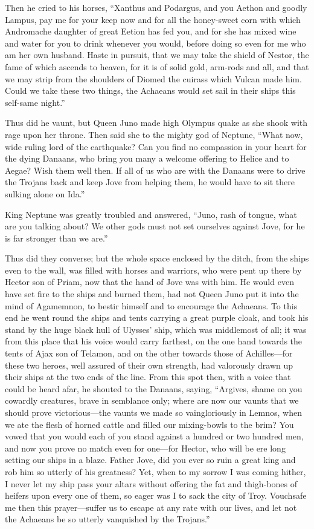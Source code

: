 Then he cried to his horses, “Xanthus and Podargus, and you Aethon and
goodly Lampus, pay me for your keep now and for all the honey-sweet corn
with which Andromache daughter of great Eetion has fed you, and for she
has mixed wine and water for you to drink whenever you would, before doing
so even for me who am her own husband. Haste in pursuit, that we may take
the shield of Nestor, the fame of which ascends to heaven, for it is of
solid gold, arm-rods and all, and that we may strip from the shoulders of
Diomed the cuirass which Vulcan made him. Could we take these two things,
the Achaeans would set sail in their ships this self-same night.”

Thus did he vaunt, but Queen Juno made high Olympus quake as she shook
with rage upon her throne. Then said she to the mighty god of Neptune,
“What now, wide ruling lord of the earthquake? Can you find no compassion
in your heart for the dying Danaans, who bring you many a welcome offering
to Helice and to Aegae? Wish them well then. If all of us who are with the
Danaans were to drive the Trojans back and keep Jove from helping them, he
would have to sit there sulking alone on Ida.”

King Neptune was greatly troubled and answered, “Juno, rash of tongue,
what are you talking about? We other gods must not set ourselves against
Jove, for he is far stronger than we are.”

Thus did they converse; but the whole space enclosed by the ditch, from
the ships even to the wall, was filled with horses and warriors, who were
pent up there by Hector son of Priam, now that the hand of Jove was with
him. He would even have set fire to the ships and burned them, had not
Queen Juno put it into the mind of Agamemnon, to bestir himself and to
encourage the Achaeans. To this end he went round the ships and tents
carrying a great purple cloak, and took his stand by the huge black hull
of Ulysses’ ship, which was middlemost of all; it was from this place that
his voice would carry farthest, on the one hand towards the tents of Ajax
son of Telamon, and on the other towards those of Achilles—for these
two heroes, well assured of their own strength, had valorously drawn up
their ships at the two ends of the line. From this spot then, with a voice
that could be heard afar, he shouted to the Danaans, saying, “Argives,
shame on you cowardly creatures, brave in semblance only; where are now
our vaunts that we should prove victorious—the vaunts we made so
vaingloriously in Lemnos, when we ate the flesh of horned cattle and
filled our mixing-bowls to the brim? You vowed that you would each of you
stand against a hundred or two hundred men, and now you prove no match
even for one—for Hector, who will be ere long setting our ships in a
blaze. Father Jove, did you ever so ruin a great king and rob him so
utterly of his greatness? Yet, when to my sorrow I was coming hither, I
never let my ship pass your altars without offering the fat and
thigh-bones of heifers upon every one of them, so eager was I to sack the
city of Troy. Vouchsafe me then this prayer—suffer us to escape at
any rate with our lives, and let not the Achaeans be so utterly vanquished
by the Trojans.”

